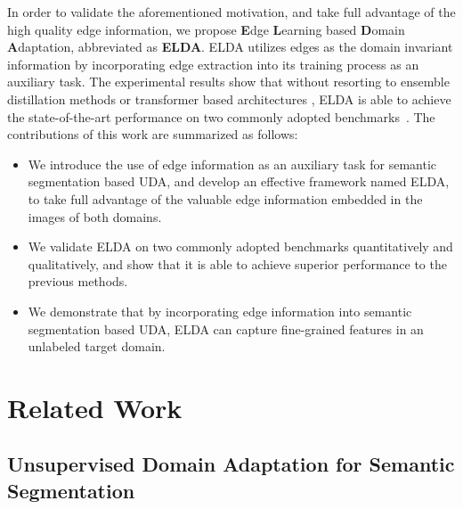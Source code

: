 \documentclass{bmvc2k}
\begin{document}
In order to validate the aforementioned motivation, and take full advantage of the high quality edge information, we propose \textbf{E}dge \textbf{L}earning based \textbf{D}omain \textbf{A}daptation, abbreviated as \textbf{ELDA}. ELDA utilizes edges as the domain invariant information by incorporating edge extraction into its training process as an auxiliary task. The experimental results show that without resorting to ensemble distillation methods \cite{zhang2021prototypical, Chao_2021_CVPR, DBLP:journals/corr/abs-2112-00295} or transformer based architectures \cite{hoyer2021daformer}, ELDA is able to achieve the state-of-the-art performance on two commonly adopted benchmarks~\cite{cordts2016cityscapes,richter2016playing,Ros_2016_CVPR}. 
The contributions of this work are summarized as follows:



\begin{itemize}
\item We introduce the use of edge information as an auxiliary task for semantic segmentation based UDA, and 
develop an effective framework named ELDA, to take full advantage of the valuable edge information embedded in the images of both domains.
\item We validate ELDA on two commonly adopted benchmarks quantitatively and qualitatively, and show that it is able to achieve superior performance to the previous methods.
\item We demonstrate that by incorporating edge information into semantic segmentation based UDA, ELDA can capture fine-grained features in an unlabeled target domain.
\end{itemize}














 
\section{Related Work}
\label{sec::related_work}
\subsection{Unsupervised Domain Adaptation for Semantic Segmentation} 
\label{subsec:uda_for_seg}
\end{document}
